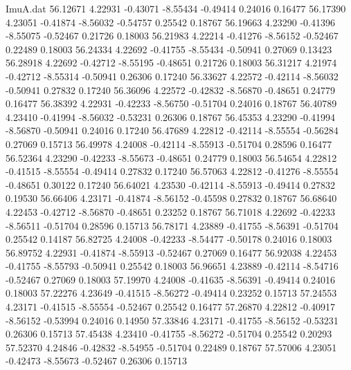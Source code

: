 \begin{filecontents}{ImuA.dat}
  56.12671    4.22931   -0.43071   -8.55434   -0.49414    0.24016    0.16477
  56.17390    4.23051   -0.41874   -8.56032   -0.54757    0.25542    0.18767
  56.19663    4.23290   -0.41396   -8.55075   -0.52467    0.21726    0.18003
  56.21983    4.22214   -0.41276   -8.56152   -0.52467    0.22489    0.18003
  56.24334    4.22692   -0.41755   -8.55434   -0.50941    0.27069    0.13423
  56.28918    4.22692   -0.42712   -8.55195   -0.48651    0.21726    0.18003
  56.31217    4.21974   -0.42712   -8.55314   -0.50941    0.26306    0.17240
  56.33627    4.22572   -0.42114   -8.56032   -0.50941    0.27832    0.17240
  56.36096    4.22572   -0.42832   -8.56870   -0.48651    0.24779    0.16477
  56.38392    4.22931   -0.42233   -8.56750   -0.51704    0.24016    0.18767
  56.40789    4.23410   -0.41994   -8.56032   -0.53231    0.26306    0.18767
  56.45353    4.23290   -0.41994   -8.56870   -0.50941    0.24016    0.17240
  56.47689    4.22812   -0.42114   -8.55554   -0.56284    0.27069    0.15713
  56.49978    4.24008   -0.42114   -8.55913   -0.51704    0.28596    0.16477
  56.52364    4.23290   -0.42233   -8.55673   -0.48651    0.24779    0.18003
  56.54654    4.22812   -0.41515   -8.55554   -0.49414    0.27832    0.17240
  56.57063    4.22812   -0.41276   -8.55554   -0.48651    0.30122    0.17240
  56.64021    4.23530   -0.42114   -8.55913   -0.49414    0.27832    0.19530
  56.66406    4.23171   -0.41874   -8.56152   -0.45598    0.27832    0.18767
  56.68640    4.22453   -0.42712   -8.56870   -0.48651    0.23252    0.18767
  56.71018    4.22692   -0.42233   -8.56511   -0.51704    0.28596    0.15713
  56.78171    4.23889   -0.41755   -8.56391   -0.51704    0.25542    0.14187
  56.82725    4.24008   -0.42233   -8.54477   -0.50178    0.24016    0.18003
  56.89752    4.22931   -0.41874   -8.55913   -0.52467    0.27069    0.16477
  56.92038    4.22453   -0.41755   -8.55793   -0.50941    0.25542    0.18003
  56.96651    4.23889   -0.42114   -8.54716   -0.52467    0.27069    0.18003
  57.19970    4.24008   -0.41635   -8.56391   -0.49414    0.24016    0.18003
  57.22276    4.23649   -0.41515   -8.56272   -0.49414    0.23252    0.15713
  57.24553    4.23171   -0.41515   -8.55554   -0.52467    0.25542    0.16477
  57.26870    4.22812   -0.40917   -8.56152   -0.53994    0.24016    0.14950
  57.33846    4.23171   -0.41755   -8.56152   -0.53231    0.26306    0.15713
  57.45438    4.23410   -0.41755   -8.56272   -0.51704    0.25542    0.20293
  57.52370    4.24846   -0.42832   -8.54955   -0.51704    0.22489    0.18767
  57.57006    4.23051   -0.42473   -8.55673   -0.52467    0.26306    0.15713

\end{filecontents}
